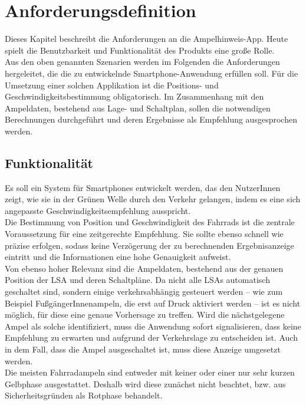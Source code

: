 \chapter{\label{chap:anforderungen}Anforderungsdefinition}
Dieses Kapitel beschreibt die Anforderungen an die Ampelhinweis-\gls{App}. Heute spielt die Benutzbarkeit und Funktionalität des Produkts eine große Rolle.\\
Aus den oben genannten Szenarien werden im Folgenden die Anforderungen hergeleitet, die die zu entwickelnde \gls{Smartphone}-Anwendung erfüllen soll. Für die Umsetzung einer solchen Applikation ist die Positions- und Geschwindigkeitsbestimmung obligatorisch. Im Zusammenhang mit den Ampeldaten, bestehend aus Lage- und Schaltplan, sollen die notwendigen Berechnungen durchgeführt und deren Ergebnisse als Empfehlung ausgesprochen werden.
\section{Funktionalität}
Es soll ein System für \glspl{Smartphone} entwickelt werden, das den NutzerInnen zeigt, wie sie in der Grünen Welle durch den Verkehr gelangen, indem es eine sich angepasste Geschwindigkeitsempfehlung ausspricht.\\ 
Die Bestimmung von Position und Geschwindigkeit des Fahrrads ist die zentrale Voraussetzung für eine zeitgerechte Empfehlung. Sie sollte ebenso schnell wie präzise erfolgen, sodass keine Verzögerung der zu berechnenden Ergebnisanzeige eintritt und die Informationen eine hohe Genauigkeit aufweist.\\
Von ebenso hoher Relevanz sind die Ampeldaten, bestehend aus der genauen Position der \gls{LSA} und deren Schaltpläne. Da nicht alle \glspl{LSA} automatisch geschaltet sind, sondern einige verkehrsabhängig gesteuert werden -- wie zum Beispiel FußgängerInnenampeln, die erst auf Druck aktiviert werden -- ist es nicht möglich, für diese eine genaue Vorhersage zu treffen. Wird die nächstgelegene Ampel als solche identifiziert, muss die Anwendung sofort signalisieren, dass keine Empfehlung zu erwarten und aufgrund der Verkehrslage zu entscheiden ist. Auch in dem Fall, dass die Ampel ausgeschaltet ist, muss diese Anzeige umgesetzt werden.\\
Die meisten Fahrradampeln sind entweder mit keiner oder einer nur sehr kurzen Gelbphase ausgestattet. Deshalb wird diese zunächst nicht beachtet, bzw. aus Sicherheitsgründen als Rotphase behandelt.

